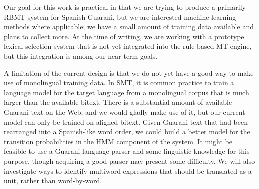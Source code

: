 \documentclass[11pt]{article}
\begin{document}
Our goal for this work is practical in that we are trying to produce a
primarily-RBMT system for Spanish-Guarani, but we are interested machine
learning methods where applicable; we have a small amount of training data
available and plans to collect more.  At the time of writing, we are working
with a prototype lexical selection system that is not yet integrated into the
rule-based MT engine, but this integration is among our near-term goals.

A limitation of the current design is that we do not yet have a good way to
make use of monolingual training data. In SMT, it is common practice to train a
language model for the target language from a monolingual corpus that is much
larger than the available bitext. There is a substantial amount of available
Guarani text on the Web, and we would gladly make use of it, but our current
model can only be trained on aligned bitext.  Given Guarani text that had been
rearranged into a Spanish-like word order, we could build a better model for
the transition probabilities in the HMM component of the system. It might be
feasible to use a Guarani-language parser and some linguistic knowledge for
this purpose, though acquiring a good parser may present some difficulty.
We will also investigate ways to identify multiword expressions that should be
translated as a unit, rather than word-by-word.


{}
\end{document}
